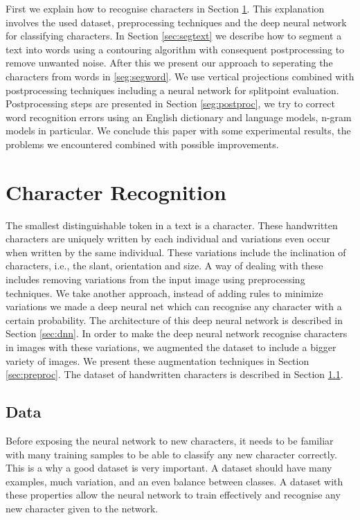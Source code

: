 \documentclass{article}
\begin{document}
First we explain how to recognise characters in Section \ref{sec:charrec}. This explanation involves the used dataset, preprocessing techniques and the deep neural network for classifying characters. 
In Section \ref{sec:segtext} we describe how to segment a text into words using a contouring algorithm with consequent postprocessing to remove unwanted noise. 
After this we present our approach to seperating the characters from words in \ref{seg:segword}. We use vertical projections combined with postprocessing techniques including a neural network for splitpoint evaluation.
Postprocessing steps are presented in Section \ref{seg:postproc}, we try to correct word recognition errors using an English dictionary and language models, n-gram models in particular.
We conclude this paper with some experimental results, the problems we encountered combined with possible improvements. 

\section{Character Recognition}
\label{sec:charrec}
The smallest distinguishable token in a text is a character. These handwritten characters are uniquely 
written by each individual and variations even occur when written by the same individual. These variations include the inclination of characters, i.e., the slant, orientation and size. 
A way of dealing with these includes removing variations from the input image using preprocessing techniques. 
We take another approach, instead of adding rules to minimize variations we made a deep neural net which can recognise any character with a certain probability. The architecture of this deep neural network is described in Section \ref{sec:dnn}. 
In order to make the deep neural network recognise characters in images with these variations, we augmented the dataset to include a bigger variety of images. We present these augmentation techniques in Section \ref{sec:preproc}. 
The dataset of handwritten characters is described in Section \ref{sec:data}.

\subsection{Data}
\label{sec:data}
Before exposing the neural network to new characters, it needs to be familiar with many training samples to be able to classify any new character correctly. 
This is a why a good dataset is very important. A dataset should have many examples, much variation, and an even balance between classes. A dataset with these properties 
allow the neural network to train effectively and recognise any new character given to the network. 
\end{document}
